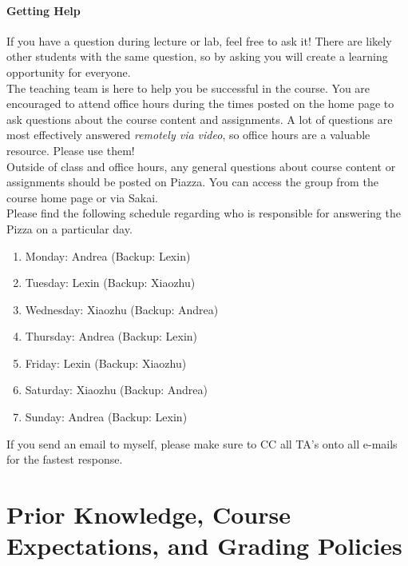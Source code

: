 \documentclass[11pt]{article}
\begin{document}
\paragraph{Getting Help}

If you have a question during lecture or lab, feel free to ask it! There are likely other students with the same question, so by asking you will create a learning opportunity for everyone. \\ 

The teaching team is here to help you be successful in the course. You are encouraged to attend office hours during the times posted on the home page to ask questions about the course content and assignments. A lot of questions are most effectively answered \emph{remotely via video}, so office hours are a valuable resource. Please use them! \\ 

Outside of class and office hours, any general questions about course content or assignments should be posted on Piazza. You can access the group from the course home page or via Sakai.  \\

Please find the following schedule regarding who is responsible for answering the Pizza on a particular day.

\begin{enumerate}
\item Monday: Andrea (Backup: Lexin)
\item Tuesday: Lexin (Backup: Xiaozhu)
\item Wednesday: Xiaozhu (Backup: Andrea)
\item Thursday: Andrea (Backup: Lexin)
\item Friday: Lexin (Backup: Xiaozhu)
\item Saturday: Xiaozhu (Backup: Andrea)
\item Sunday: Andrea (Backup: Lexin)
\end{enumerate}

If you send an email to myself, please make sure to CC all TA's onto all e-mails for the fastest response.\\



\section{Prior Knowledge, Course Expectations, and Grading Policies}
\end{document}
